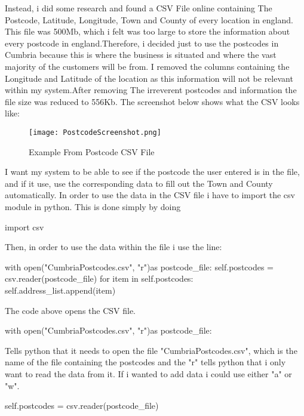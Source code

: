  Instead, i did some research and found a CSV File online containing The Postcode, Latitude, Longitude, Town and County of every location in england. This file was 500Mb, which i felt was too large to store the information about every postcode in england.Therefore, i decided just to use the postcodes in Cumbria because this is where the business is situated and where the vast majority of the customers will be from. I removed the columns containing the Longitude and Latitude of the location as this information will not be relevant within my system.After removing The irreverent postcodes and information the file size was reduced to 556Kb. The screenshot below shows what the CSV looks like:

\begin{figure}[H]
\caption{Example From Postcode CSV File} \label{fig:CSV File Exmaple}
\hfill\texttt{[image: PostcodeScreenshot.png]}\hspace*{\fill}
\end{figure}

I want my system to be able to see if the postcode the user entered is in the file, and if it use, use the corresponding data to fill out the Town and County automatically. In order to use the data in the CSV file i have to import the csv module in python. This is done simply by doing 

\begin{python} 
import csv 
\end{python} 

Then, in order to use the data within the file i use the line:

\begin{python}
with open("CumbriaPostcodes.csv", "r")as postcode_file:
	self.postcodes = csv.reader(postcode_file)
	for item in self.postcodes:
		self.address_list.append(item)
\end{python}

The code above opens the CSV file. 
 \begin{python} 
 with open("CumbriaPostcodes.csv", "r")as postcode_file:
 \end{python}
 
 Tells python that it needs to open the file "CumbriaPostcodes.csv", which is the name of the file containing the postcodes and the "r" tells python that i only want to read the data from it. If i wanted to add data i could use either "a" or "w". 
 
 \begin{python} 
 self.postcodes = csv.reader(postcode_file)
   \end{python} 
   
